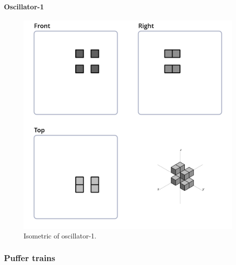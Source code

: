 \paragraph{Oscillator-1}
\begin{figure}
	\centering
	\includegraphics[scale=0.3]{iso_settings/osc_1.png}
	\caption{Isometric of oscillator-1.}
  \label{fig:iso-osc-1}
\end{figure}

\subsubsection{Puffer trains}
